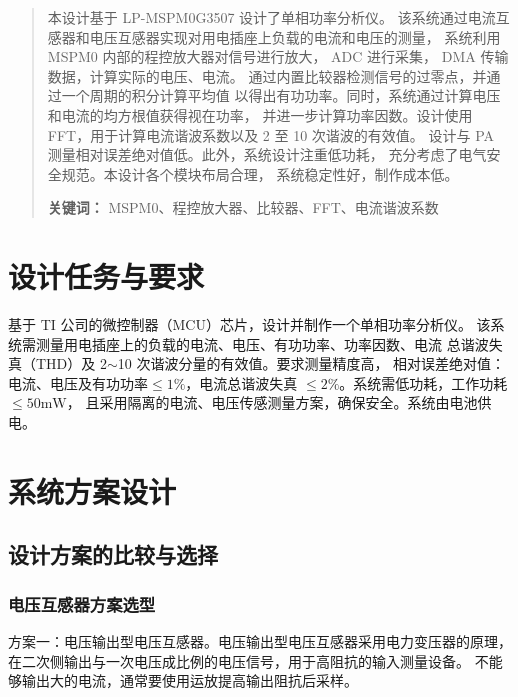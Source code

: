 \documentclass[a4paper,12pt,UTF8]{article}
\begin{document}
\cover
\thispagestyle{empty}
\pagestyle{empty}


\newpage
\begin{abstract}
本设计基于 LP-MSPM0G3507 设计了单相功率分析仪。
该系统通过电流互感器和电压互感器实现对用电插座上负载的电流和电压的测量，
系统利用 MSPM0 内部的程控放大器对信号进行放大， 
ADC 进行采集， DMA 传输数据，计算实际的电压、电流。
通过内置比较器检测信号的过零点，并通过一个周期的积分计算平均值
以得出有功功率。同时，系统通过计算电压和电流的均方根值获得视在功率，
并进一步计算功率因数。设计使用 FFT，用于计算电流谐波系数以及 2 至 10 次谐波的有效值。
设计与 PA 测量相对误差绝对值低。此外，系统设计注重低功耗，
充分考虑了电气安全规范。本设计各个模块布局合理，
系统稳定性好，制作成本低。


\noindent \textbf{关键词：} 
MSPM0、程控放大器、比较器、FFT、电流谐波系数
\end{abstract}

\newpage

\tableofcontents

\newpage
\pagestyle{fancy}
\setcounter{page}{1}
\section{设计任务与要求}
基于 TI 公司的微控制器（MCU）芯片，设计并制作一个单相功率分析仪。
该系统需测量用电插座上的负载的电流、电压、有功功率、功率因数、电流
总谐波失真（THD）及 2$\sim$10 次谐波分量的有效值。要求测量精度高，
相对误差绝对值：电流、电压及有功功率$\leqslant 1\%$，电流总谐波失真
$\leqslant 2\%$。系统需低功耗，工作功耗$\leqslant 50\mathrm{mW}$，
且采用隔离的电流、电压传感测量方案，确保安全。系统由电池供电。

\section{系统方案设计}
\subsection{设计方案的比较与选择}

\subsubsection{电压互感器方案选型}
方案一：电压输出型电压互感器。电压输出型电压互感器采用电力变压器的原理，
在二次侧输出与一次电压成比例的电压信号，用于高阻抗的输入测量设备。
不能够输出大的电流，通常要使用运放提高输出阻抗后采样。
\end{document}
